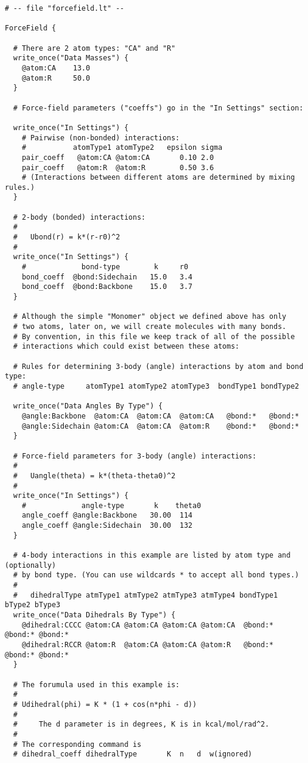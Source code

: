 \documentclass[11pt]{article}
\begin{document}
\begin{verbatim}
# -- file "forcefield.lt" --

ForceField {

  # There are 2 atom types: "CA" and "R"
  write_once("Data Masses") {
    @atom:CA    13.0
    @atom:R     50.0
  }

  # Force-field parameters ("coeffs") go in the "In Settings" section:

  write_once("In Settings") {
    # Pairwise (non-bonded) interactions:
    #           atomType1 atomType2   epsilon sigma
    pair_coeff   @atom:CA @atom:CA       0.10 2.0
    pair_coeff   @atom:R  @atom:R        0.50 3.6
    # (Interactions between different atoms are determined by mixing rules.)
  }

  # 2-body (bonded) interactions:
  #
  #   Ubond(r) = k*(r-r0)^2
  #
  write_once("In Settings") {
    #             bond-type        k     r0
    bond_coeff  @bond:Sidechain   15.0   3.4
    bond_coeff  @bond:Backbone    15.0   3.7
  }

  # Although the simple "Monomer" object we defined above has only
  # two atoms, later on, we will create molecules with many bonds.
  # By convention, in this file we keep track of all of the possible
  # interactions which could exist between these atoms:

  # Rules for determining 3-body (angle) interactions by atom and bond type:
  # angle-type     atomType1 atomType2 atomType3  bondType1 bondType2

  write_once("Data Angles By Type") {
    @angle:Backbone  @atom:CA  @atom:CA  @atom:CA   @bond:*   @bond:*
    @angle:Sidechain @atom:CA  @atom:CA  @atom:R    @bond:*   @bond:*
  }

  # Force-field parameters for 3-body (angle) interactions:
  #
  #   Uangle(theta) = k*(theta-theta0)^2
  #
  write_once("In Settings") {
    #             angle-type       k    theta0
    angle_coeff @angle:Backbone   30.00  114
    angle_coeff @angle:Sidechain  30.00  132
  }

  # 4-body interactions in this example are listed by atom type and (optionally)
  # by bond type. (You can use wildcards * to accept all bond types.)
  #
  #   dihedralType atmType1 atmType2 atmType3 atmType4 bondType1 bType2 bType3
  write_once("Data Dihedrals By Type") {
    @dihedral:CCCC @atom:CA @atom:CA @atom:CA @atom:CA  @bond:* @bond:* @bond:*
    @dihedral:RCCR @atom:R  @atom:CA @atom:CA @atom:R   @bond:* @bond:* @bond:*
  }

  # The forumula used in this example is:
  #
  # Udihedral(phi) = K * (1 + cos(n*phi - d))
  #
  #     The d parameter is in degrees, K is in kcal/mol/rad^2.
  #
  # The corresponding command is 
  # dihedral_coeff dihedralType       K  n   d  w(ignored)


\end{verbatim}
\end{document}

